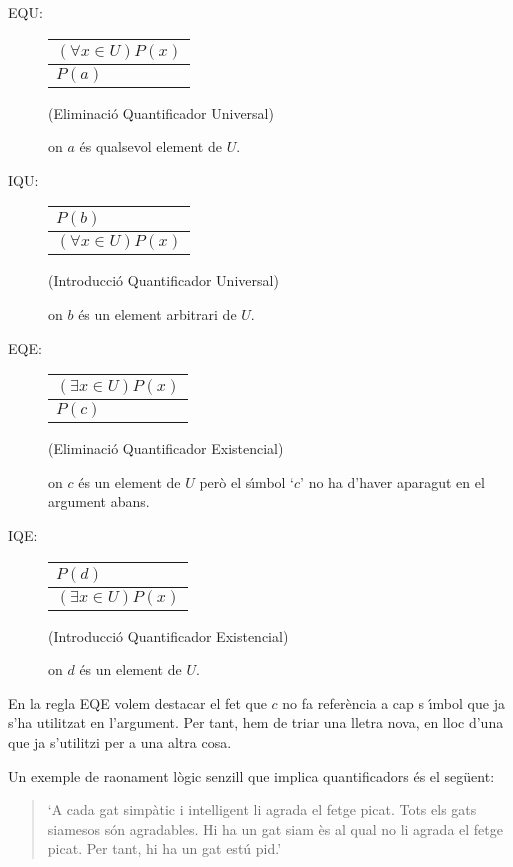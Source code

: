 \begin{description}
\item[EQU:]
\begin{tabular}{l}
$\left( \forall x\in U\right) P(x)$ \\ \hline
$P(a)$%
\end{tabular}
(Eliminaci\'{o} Quantificador Universal)

on $a$ \'{e}s qualsevol element de $U$.

\item[IQU:]
\begin{tabular}{l}
$P(b)$ \\ \hline
$\left( \forall x\in U\right) P(x)$%
\end{tabular}
(Introducci\'{o} Quantificador Universal)

on $b$ \'{e}s un element arbitrari de $U$.

\item[EQE:]
\begin{tabular}{l}
$\left( \exists x\in U\right) P(x)$ \\ \hline
$P(c)$%
\end{tabular}
(Eliminaci\'{o} Quantificador Existencial)

on $c$ \'{e}s un element de $U$ per\`{o} el s\'{\i}mbol `$c$' no ha d'haver
aparagut en el argument abans.

\item[IQE:]
\begin{tabular}{l}
$P(d)$ \\ \hline
$\left( \exists x\in U\right) P(x)$%
\end{tabular}
(Introducci\'{o} Quantificador Existencial)

on $d$ \'{e}s un element de $U$.
\end{description}

En la regla EQE volem destacar el fet que $c$ no fa refer\`{e}ncia a cap s%
\'{\i}mbol que ja s'ha utilitzat en l'argument. Per tant, hem de triar una
lletra nova, en lloc d'una que ja s'utilitzi per a una altra cosa.

\bigskip

Un exemple de raonament l\`{o}gic senzill que implica quantificadors \'{e}s
el seg\"{u}ent:

\begin{quote}
`A cada gat simp\`{a}tic i intel\textperiodcentered ligent li agrada el
fetge picat. Tots els gats siamesos s\'{o}n agradables. Hi ha un gat siam%
\`{e}s al qual no li agrada el fetge picat. Per tant, hi ha un gat est\'{u}%
pid.'
\end{quote}

